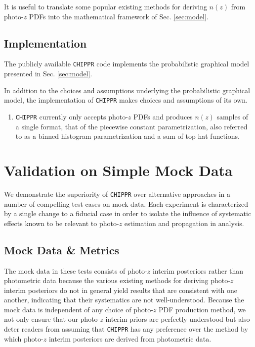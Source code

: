 \documentclass[iop]{emulateapj}
\newcommand{\chippr}{\texttt{CHIPPR} }
\begin{document}
It is useful to translate some popular existing methods for deriving $n(z)$ 
from photo-$z$ PDFs into the mathematical framework of Sec. \ref{sec:model}.

\subsection{Implementation}
\label{sec:implementation}

The publicly available \chippr code implements the probabilistic graphical 
model presented in Sec. \ref{sec:model}.  

In addition to the choices and assumptions underlying the probabilistic 
graphical model, the implementation of \chippr makes choices and assumptions of 
its own.

\begin{enumerate}
	\item \chippr currently only accepts photo-$z$ PDFs and produces $n(z)$ 
samples of a single format, that of the piecewise constant parametrization, 
also referred to as a binned histogram parametrization and a sum of top hat 
functions.
\end{enumerate}

\section{Validation on Simple Mock Data}
\label{sec:validation}

We demonstrate the superiority of \chippr over alternative approaches in a 
number of compelling test cases on mock data.  Each experiment is characterized 
by a single change to a fiducial case in order to isolate the influence of 
systematic effects known to be relevant to photo-$z$ estimation and propagation 
in analysis.  

\subsection{Mock Data \& Metrics}
\label{sec:validintro}

The mock data in these tests consists of photo-$z$ interim posteriors rather 
than photometric data because the various existing methods for deriving 
photo-$z$ interim posteriors do not in general yield results that are 
consistent with one another, indicating that their systematics are not 
well-understood.  Because the mock data is independent of any choice of 
photo-$z$ PDF production method, we not only ensure that our photo-$z$ interim 
priors are perfectly understood but also deter readers from assuming that 
\chippr has any preference over the method by which photo-$z$ interim 
posteriors are derived from photometric data.
\end{document}
